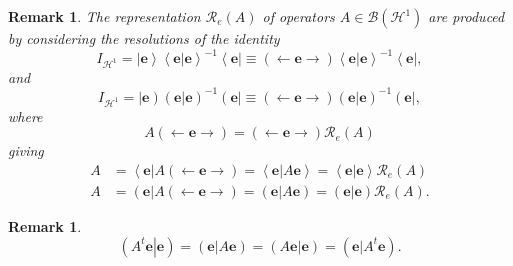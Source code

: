 \documentclass[aps,preprint]{revtex4}%
\newtheorem{remark}[theorem]{Remark}
\begin{document}
\begin{remark}
The representation $\mathcal{R}_{e}\left(  A\right)  $ of operators
$A\in\mathcal{B}\left(  \mathcal{H}^{1}\right)  $ are produced by considering
the resolutions of the identity
\begin{equation}
I_{\mathcal{H}^{1}}=\left\vert \mathbf{e}\right\rangle \left\langle \left.
\mathbf{e}\right\vert \mathbf{e}\right\rangle ^{-1}\left\langle \mathbf{e}%
\right\vert \equiv\left(  \longleftarrow\mathbf{e\rightarrow}\right)
\left\langle \left.  \mathbf{e}\right\vert \mathbf{e}\right\rangle
^{-1}\left\langle \mathbf{e}\right\vert ,
\end{equation}
and
\begin{equation}
I_{\mathcal{H}^{1}}=\left\vert \mathbf{e}\right)  \left(  \left.
\mathbf{e}\right\vert \mathbf{e}\right)  ^{-1}\left(  \mathbf{e}\right\vert
\equiv\left(  \longleftarrow\mathbf{e\rightarrow}\right)  \left(  \left.
\mathbf{e}\right\vert \mathbf{e}\right)  ^{-1}\left(  \mathbf{e}\right\vert ,
\end{equation}
where%
\begin{equation}
A\left(  \longleftarrow\mathbf{e\rightarrow}\right)  =\left(  \longleftarrow
\mathbf{e\rightarrow}\right)  \mathcal{R}_{e}\left(  A\right)
\end{equation}
giving
\begin{align}
A  &  =\left\langle \mathbf{e}\right\vert A\left(  \longleftarrow
\mathbf{e\rightarrow}\right)  =\left\langle \left.  \mathbf{e}\right\vert
A\mathbf{e}\right\rangle =\left\langle \left.  \mathbf{e}\right\vert
\mathbf{e}\right\rangle \mathcal{R}_{e}\left(  A\right) \\
A  &  =\left(  \mathbf{e}\right\vert A\left(  \longleftarrow
\mathbf{e\rightarrow}\right)  =\left(  \left.  \mathbf{e}\right\vert
A\mathbf{e}\right)  =\left(  \left.  \mathbf{e}\right\vert \mathbf{e}\right)
\mathcal{R}_{e}\left(  A\right)  .
\end{align}

\end{remark}

\begin{remark}%
\begin{equation}
\left(  \left.  A^{t}\mathbf{e}\right\vert \mathbf{e}\right)  =\left(  \left.
\mathbf{e}\right\vert A\mathbf{e}\right)  =\left(  \left.  A\mathbf{e}%
\right\vert \mathbf{e}\right)  =\left(  \left.  \mathbf{e}\right\vert
A^{t}\mathbf{e}\right)  .
\end{equation}

\end{remark}
\end{document}
